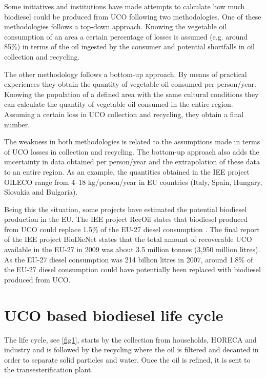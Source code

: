 \documentclass[sustainability,article,submit,moreauthors,pdftex,12pt,a4paper]{mdpi}
\begin{document}
Some initiatives and institutions have made attempts to calculate how much biodiesel could be produced from UCO following two methodologies. One of these methodologies follows a top-down approach. Knowing the vegetable oil consumption of an area a certain percentage of losses is assumed (e.g. around 85\%) in terms of the oil ingested by the consumer and potential shortfalls in oil collection and recycling.

The other methodology follows a bottom-up approach. By means of practical experiences they obtain the quantity of vegetable oil consumed per person/year. Knowing the population of a defined area with the same cultural conditions they can calculate the quantity of vegetable oil consumed in the entire region. Assuming a certain loss in UCO collection and recycling, they obtain a final number.

The weakness in both methodologies is related to the assumptions made in terms of UCO losses in collection and recycling. The bottom-up approach also adds the uncertainty in data obtained per person/year and the extrapolation of these data to an entire region. As an example, the quantities obtained in the IEE project OILECO range from 4--18 kg/person/year \cite{OILECO2013} in EU countries (Italy, Spain, Hungary, Slovakia and Bulgaria).
 
Being this the situation, some projects have estimated the potential biodiesel production in the EU. The IEE project RecOil states that biodiesel produced from UCO could replace 1.5\% of the EU-27 diesel consumption \cite{RecOil2013}. The final report of the IEE project BioDieNet \cite{BioDieNet2009} states that the total amount of recoverable UCO available in the EU-27 in 2009 was about 3.5 million tonnes (3,950 million litres). As the EU-27 diesel consumption was 214 billion litres in 2007, around 1.8\% of the EU-27 diesel consumption could have potentially been replaced with biodiesel produced from UCO.


\section{UCO based biodiesel life cycle}

The life cycle, see \cref{fig1}, starts by the collection from households, HORECA and industry and is followed by the recycling where the oil is filtered and decanted in order to separate solid particles and water. Once the oil is refined, it is sent to the transesterification plant.
 
\end{document}
